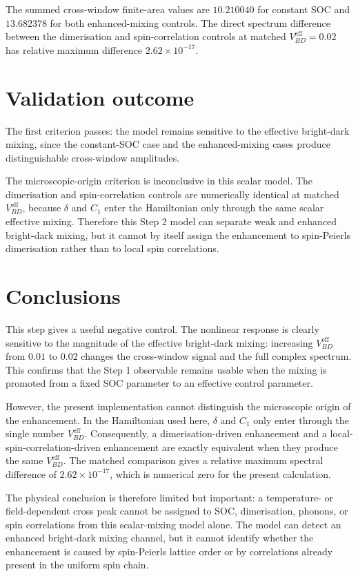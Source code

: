 \documentclass[11pt]{article}
\begin{document}
The summed cross-window finite-area values are $10.210040$ for constant SOC
and $13.682378$ for both enhanced-mixing controls.  The direct spectrum
difference between the dimerisation and spin-correlation controls at matched
$V_{BD}^{\mathrm{eff}}=0.02$ has relative maximum difference
$2.62\times10^{-17}$.

\section{Validation outcome}
The first criterion passes: the model remains sensitive to the effective
bright-dark mixing, since the constant-SOC case and the enhanced-mixing cases
produce distinguishable cross-window amplitudes.

The microscopic-origin criterion is inconclusive in this scalar model.  The
dimerisation and spin-correlation controls are numerically identical at matched
$V_{BD}^{\mathrm{eff}}$, because $\delta$ and $C_1$ enter the Hamiltonian only
through the same scalar effective mixing.  Therefore this Step 2 model can
separate weak and enhanced bright-dark mixing, but it cannot by itself assign
the enhancement to spin-Peierls dimerisation rather than to local spin
correlations.

\section{Conclusions}
This step gives a useful negative control.  The nonlinear response is clearly
sensitive to the magnitude of the effective bright-dark mixing: increasing
$V_{BD}^{\mathrm{eff}}$ from $0.01$ to $0.02$ changes the cross-window signal
and the full complex spectrum.  This confirms that the Step 1 observable remains
usable when the mixing is promoted from a fixed SOC parameter to an effective
control parameter.

However, the present implementation cannot distinguish the microscopic origin
of the enhancement.  In the Hamiltonian used here, $\delta$ and $C_1$ only enter
through the single number $V_{BD}^{\mathrm{eff}}$.  Consequently, a
dimerisation-driven enhancement and a local-spin-correlation-driven enhancement
are exactly equivalent when they produce the same $V_{BD}^{\mathrm{eff}}$.  The
matched comparison gives a relative maximum spectral difference of
$2.62\times10^{-17}$, which is numerical zero for the present calculation.

The physical conclusion is therefore limited but important: a temperature- or
field-dependent cross peak cannot be assigned to SOC, dimerisation, phonons, or
spin correlations from this scalar-mixing model alone.  The model can detect an
enhanced bright-dark mixing channel, but it cannot identify whether the
enhancement is caused by spin-Peierls lattice order or by correlations already
present in the uniform spin chain.
\end{document}
